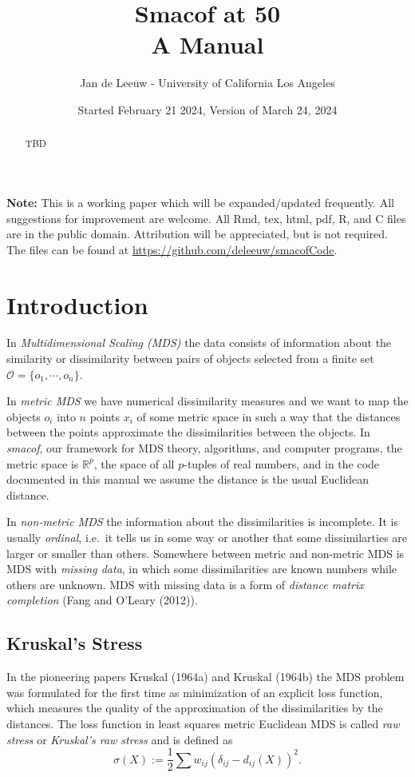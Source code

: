 \documentclass[
  12pt,
]{article}
\title{Smacof at 50\\
A Manual}
\author{Jan de Leeuw - University of California Los Angeles}
\date{Started February 21 2024, Version of March 24, 2024}
\begin{document}
\maketitle
\begin{abstract}
TBD
\end{abstract}

{
\setcounter{tocdepth}{4}
\tableofcontents
}
\textbf{Note:} This is a working paper which will be expanded/updated
frequently. All suggestions for improvement are welcome. All Rmd, tex,
html, pdf, R, and C files are in the public domain. Attribution will be
appreciated, but is not required. The files can be found at
\url{https://github.com/deleeuw/smacofCode}.

\section{Introduction}\label{introduction}

In \emph{Multidimensional Scaling (MDS)} the data consists of information about the similarity or dissimilarity between pairs of objects selected from a finite set \(\mathcal{O}=\{o_1,\cdots,o_n\}\).

In \emph{metric MDS} we have numerical dissimilarity measures and we want to map
the objects \(o_i\) into \(n\) points \(x_i\) of some metric space in such a way
that the distances between the points approximate the dissimilarities
between the objects. In \emph{smacof}, our framework for MDS theory, algorithms, and computer programs, the metric space is \(\mathbb{R}^p\), the space of all \(p\)-tuples of real numbers, and in the code documented in this manual we assume the distance is the usual Euclidean distance.

In \emph{non-metric MDS} the information about the dissimilarities is incomplete. It is usually \emph{ordinal}, i.e.~it tells
us in some way or another that some dissimilarties are larger or smaller than
others. Somewhere between metric and non-metric MDS is MDS with \emph{missing data},
in which some dissimilarities are known numbers while others are unknown. MDS with missing data is a form of \emph{distance matrix completion} (Fang and O'Leary (2012)).

\subsection{Kruskal's Stress}\label{kruskals-stress}

In the pioneering papers Kruskal (1964a) and Kruskal (1964b) the MDS problem
was formulated for the first time as minimization of an explicit loss
function, which measures the quality of the approximation of the
dissimilarities by the distances. The loss function in least squares metric Euclidean MDS
is called \emph{raw stress} or \emph{Kruskal's raw stress} and is defined as
\begin{equation}
\sigma(X):=\frac12\sum w_{ij}(\delta_{ij}-d_{ij}(X))^2.
\label{eq:stressdef}
\end{equation}
\end{document}
